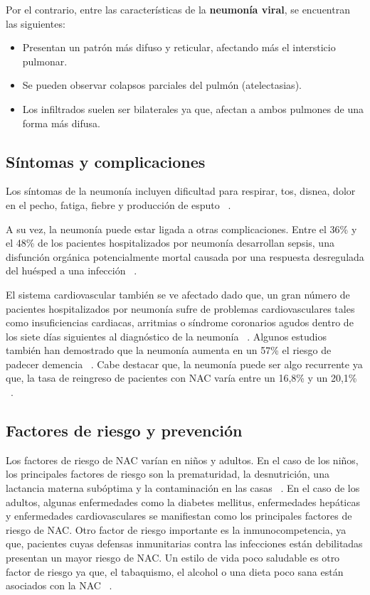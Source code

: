 Por el contrario, entre las características de la \textbf{neumonía viral}, se encuentran las siguientes:
\begin{itemize}
    \item Presentan un patrón más difuso y reticular, afectando más el intersticio pulmonar.
    \item Se pueden observar colapsos parciales del pulmón (atelectasias).
    \item Los infiltrados suelen ser bilaterales ya que, afectan a ambos pulmones de una forma más difusa.
\end{itemize}


\subsection{Síntomas y complicaciones}

Los síntomas de la neumonía incluyen dificultad para respirar, tos, disnea, dolor en el pecho, fatiga, fiebre y producción de esputo ~\cite{lim2022pneumonia}. 

A su vez, la neumonía puede estar ligada a otras complicaciones. Entre el 36\% y el 48\% de los pacientes hospitalizados por neumonía desarrollan sepsis, una disfunción orgánica potencialmente mortal causada por una respuesta desregulada del huésped a una infección ~\cite{ManualMSD24}. 

El sistema cardiovascular también se ve afectado dado que, un gran número de pacientes hospitalizados por neumonía sufre de problemas cardiovasculares tales como insuficiencias cardiacas, arritmias o síndrome coronarios agudos dentro de los siete días siguientes al diagnóstico de la neumonía ~\cite{antoni2021}. Algunos estudios también han demostrado que la neumonía aumenta en un 57\% el riesgo de padecer demencia ~\cite{shah2013bidirectional}. Cabe destacar que, la neumonía puede ser algo recurrente ya que, la tasa de reingreso de pacientes con NAC varía entre un 16,8\% y un 20,1\% ~\cite{antoni2021}.


\subsection{Factores de riesgo y prevención}

Los factores de riesgo de NAC varían en niños y adultos. En el caso de los niños, los principales factores de riesgo son la prematuridad, la desnutrición, una lactancia materna subóptima y la contaminación en las casas ~\cite{antoni2021}.
En el caso de los adultos, algunas enfermedades como la diabetes mellitus, enfermedades hepáticas y enfermedades cardiovasculares se manifiestan como los principales factores de riesgo de NAC. Otro factor de riesgo importante es la inmunocompetencia, ya que, pacientes cuyas defensas inmunitarias contra las infecciones están debilitadas presentan un mayor riesgo de NAC. Un estilo de vida poco saludable es otro factor de riesgo ya que, el tabaquismo, el alcohol o una dieta poco sana están asociados con la NAC ~\cite{antoni2021}. 

